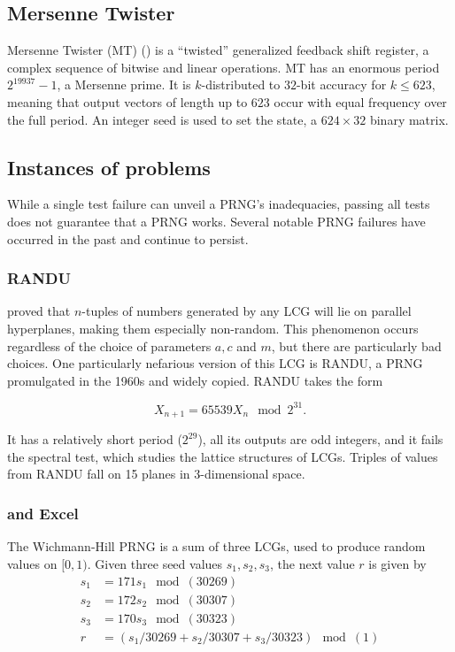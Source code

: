 \documentclass[12pt]{article}
\newcommand{\todo}[1]{{\color{red}{TO DO: \sc #1}}}
\begin{document}
\subsection{Mersenne Twister}
Mersenne Twister (MT) (\cite{matsumoto_mersenne_1998}) is a ``twisted'' generalized feedback shift register, a complex sequence of bitwise and linear operations.
MT has an enormous period $2^{19937}-1$, a Mersenne prime.
It is $k$-distributed to $32$-bit accuracy for $k \leq 623$, meaning that output vectors of length up to $623$ occur with equal frequency over the full period.
An integer seed is used to set the state, a $624 \times 32$ binary matrix.

\subsection{Instances of problems}
While a single test failure can unveil a PRNG's inadequacies, passing all tests does not guarantee that a PRNG works.
Several notable PRNG failures have occurred in the past and continue to persist.
 
\subsubsection{RANDU}

\citet{marsaglia_random_1968} proved that $n$-tuples of numbers generated by any LCG will lie on parallel hyperplanes, making them especially non-random.
This phenomenon occurs regardless of the choice of parameters $a, c$ and $m$, but there are particularly bad choices.
One particularly nefarious version of this LCG is RANDU, a PRNG promulgated in the 1960s and widely copied. 
RANDU takes the form

$$X_{n+1} = 65539 X_n \mod 2^{31}.$$

It has a relatively short period ($2^{29}$), all its outputs are odd integers, and it fails the spectral test, which studies the lattice structures of LCGs.
Triples of values from RANDU fall on 15 planes in 3-dimensional space.
\todo{mention RANDU blowing up science, finding erroneous crystallographic structure}


\subsubsection{\citet{wichmann_algorithm_1982} and Excel}
The Wichmann-Hill PRNG is a sum of three LCGs, used to produce random values on $[0, 1)$.
Given three seed values $s_1, s_2, s_3$, the next value $r$ is given by
\begin{align*}
s_1 &= 171 s_1\mod(30269) \\
s_2 &= 172 s_2 \mod(30307) \\
s_3 &= 170 s_3 \mod(30323) \\
r &= (s_1/30269 + s_2/30307 + s_3/30323) \mod(1)
\end{align*}
\end{document}
